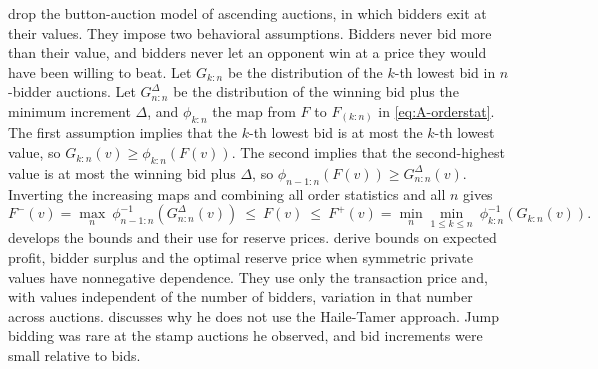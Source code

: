 \citet{HaileTamer2003} drop the button-auction model of ascending auctions, in which bidders exit at
their values. They impose two behavioral assumptions. Bidders never bid more than their value, and
bidders never let an opponent win at a price they would have been willing to beat. Let $G_{k:n}$ be the
distribution of the $k$-th lowest bid in $n$-bidder auctions. Let $G^{\Delta}_{n:n}$ be the distribution
of the winning bid plus the minimum increment $\Delta$, and $\phi_{k:n}$ the map from $F$ to $F_{(k:n)}$
in \eqref{eq:A-orderstat}. The first assumption implies that the $k$-th lowest bid is at most the $k$-th
lowest value, so $G_{k:n}(v)\ge\phi_{k:n}(F(v))$. The second implies that the second-highest value is at
most the winning bid plus $\Delta$, so $\phi_{n-1:n}(F(v))\ge G^{\Delta}_{n:n}(v)$. Inverting the
increasing maps and combining all order statistics and all $n$ gives
\citep[Section~4.3.1, eqs.~(4.10)--(4.11)]{AtheyHaile2007}
\begin{equation}\label{eq:A-ht}
F^-(v)=\max_n\ \phi_{n-1:n}^{-1}\!\left(G^{\Delta}_{n:n}(v)\right)\ \le\ F(v)\ \le\
F^+(v)=\min_{n}\min_{1\le k\le n}\ \phi_{k:n}^{-1}\!\left(G_{k:n}(v)\right).
\end{equation}
 develops the bounds and their use for reserve prices.
\citet[pp.~493--499]{AradillasLopezGandhiQuint2013} derive bounds on expected profit, bidder surplus and
the optimal reserve price when symmetric private values have nonnegative dependence. They use only the transaction price and,
with values independent of the number of bidders, variation in that number across auctions.
\citet[footnote~37]{Asker2010}
discusses why he does not use the Haile-Tamer approach. Jump bidding was rare at the stamp auctions he
observed, and bid increments were small relative to bids.

